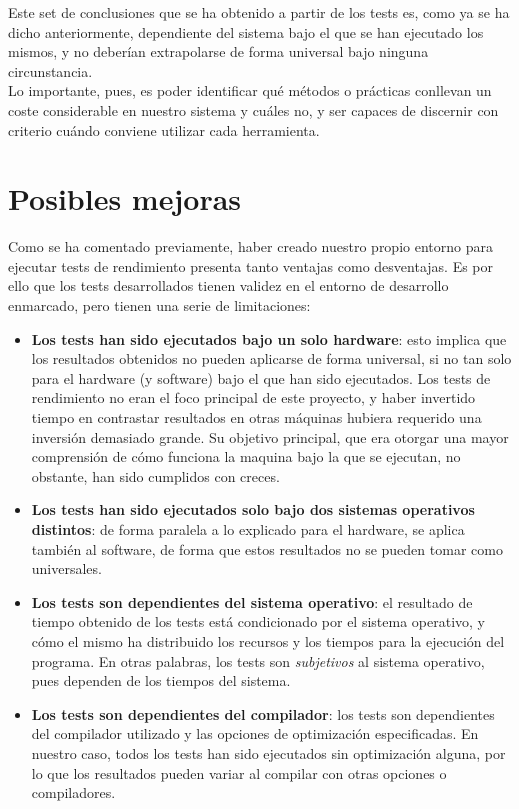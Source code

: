 Este set de conclusiones que se ha obtenido a partir de los tests es, como ya se ha dicho anteriormente, dependiente del sistema bajo el que se han ejecutado los mismos, y no deberían extrapolarse de forma universal bajo ninguna circunstancia.\\

Lo importante, pues, es poder identificar qué métodos o prácticas conllevan un coste considerable en nuestro sistema y cuáles no, y ser capaces de discernir con criterio cuándo conviene utilizar cada herramienta.

\section{Posibles mejoras}

Como se ha comentado previamente, haber creado nuestro propio entorno para ejecutar tests de rendimiento presenta tanto ventajas como desventajas. Es por ello que los tests desarrollados tienen validez en el entorno de desarrollo enmarcado, pero tienen una serie de limitaciones:

\begin{itemize}
	\item \textbf{Los tests han sido ejecutados bajo un solo hardware}: esto implica que los resultados obtenidos no pueden aplicarse de forma universal, si no tan solo para el hardware (y software) bajo el que han sido ejecutados. Los tests de rendimiento no eran el foco principal de este proyecto, y haber invertido tiempo en contrastar resultados en otras máquinas hubiera requerido una inversión demasiado grande. Su objetivo principal, que era otorgar una mayor comprensión de cómo funciona la maquina bajo la que se ejecutan, no obstante, han sido cumplidos con creces.
	\item \textbf{Los tests han sido ejecutados solo bajo dos sistemas operativos distintos}: de forma paralela a lo explicado para el hardware, se aplica también al software, de forma que estos resultados no se pueden tomar como universales.
	\item \textbf{Los tests son dependientes del sistema operativo}: el resultado de tiempo obtenido de los tests está condicionado por el sistema operativo, y cómo el mismo ha distribuido los recursos y los tiempos para la ejecución del programa. En otras palabras, los tests son \emph{subjetivos} al sistema operativo, pues dependen de los tiempos del sistema.
	\item \textbf{Los tests son dependientes del compilador}: los tests son dependientes del compilador utilizado y las opciones de optimización especificadas. En nuestro caso, todos los tests han sido ejecutados sin optimización alguna, por lo que los resultados pueden variar al compilar con otras opciones o compiladores.
\end{itemize}


